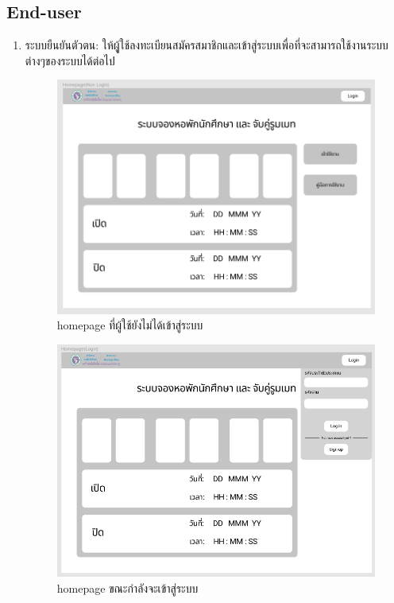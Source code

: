 \subsection{End-user}
\begin{enumerate}
  \item ระบบยืนยันตัวตน: ให้ผูู้ใช้ลงทะเบียนสมัครสมาชิกและเข้าสู่ระบบเพื่อที่จะสามารถใช้งานระบบต่างๆของระบบได้ต่อไป
  \begin{figure}[h]
  \begin{center}
  \includegraphics[width=\linewidth]{photo/homepageNoAuth.png}
  \end{center}
  \caption{homepage ที่ผู้ใช้ยังไม่ได้เข้าสู่ระบบ}
  \label{fig:hp-no-auth}
  \end{figure}

  \begin{figure}[h]
  \begin{center}
  \includegraphics[width=\linewidth]{photo/homepageLogin.png}
  \end{center}
  \caption{homepage ขณะกำลังจะเข้าสู่ระบบ}
  \label{fig:hp-login}
  \end{figure}


\end{enumerate}
